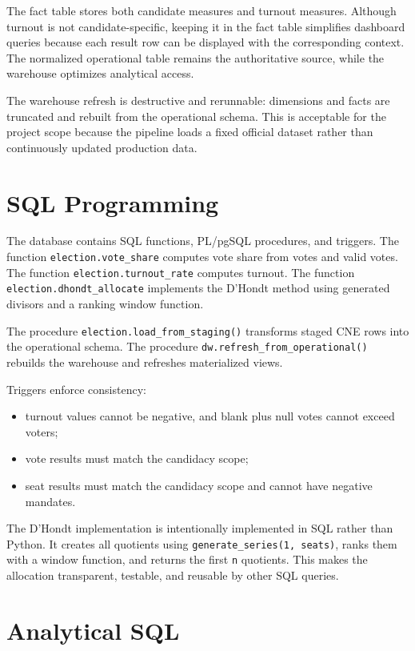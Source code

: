 \documentclass[11pt,twocolumn]{article}
\begin{document}
The fact table stores both candidate measures and turnout measures. Although turnout is not candidate-specific, keeping it in the fact table simplifies dashboard queries because each result row can be displayed with the corresponding context. The normalized operational table remains the authoritative source, while the warehouse optimizes analytical access.

The warehouse refresh is destructive and rerunnable: dimensions and facts are truncated and rebuilt from the operational schema. This is acceptable for the project scope because the pipeline loads a fixed official dataset rather than continuously updated production data.

\section{SQL Programming}

The database contains SQL functions, PL/pgSQL procedures, and triggers. The function \texttt{election.vote\_share} computes vote share from votes and valid votes. The function \texttt{election.turnout\_rate} computes turnout. The function \texttt{election.dhondt\_allocate} implements the D'Hondt method using generated divisors and a ranking window function.

The procedure \texttt{election.load\_from\_staging()} transforms staged CNE rows into the operational schema. The procedure \texttt{dw.refresh\_from\_operational()} rebuilds the warehouse and refreshes materialized views.

Triggers enforce consistency:

\begin{itemize}
  \item turnout values cannot be negative, and blank plus null votes cannot exceed voters;
  \item vote results must match the candidacy scope;
  \item seat results must match the candidacy scope and cannot have negative mandates.
\end{itemize}

The D'Hondt implementation is intentionally implemented in SQL rather than Python. It creates all quotients using \texttt{generate\_series(1, seats)}, ranks them with a window function, and returns the first \texttt{n} quotients. This makes the allocation transparent, testable, and reusable by other SQL queries.

\section{Analytical SQL}
\end{document}
